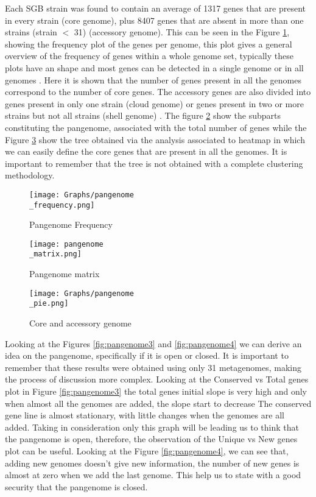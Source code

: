 \documentclass[a4paper,titlepage, oneside]{book}
\begin{document}
Each SGB strain was found to contain an average of 1317 genes that are present in every strain (core genome), plus 8407 genes that are absent in more than one strains (strain $<$ 31) (accessory genome). This can be seen in the Figure \ref{fig:pangenome2}, showing the frequency plot of the genes per genome, this plot gives a general overview of the frequency of genes within a whole genome set, typically these plots have an shape and most genes can be detected in a single genome or in all genomes \cite{Analysis-roary}. Here it is shown that the number of genes present in all the genomes correspond to the number of core genes.
The accessory genes are also divided into genes present in only one strain (cloud genome) or genes present in two or more strains but not all strains (shell genome) \cite{Medini}. The figure \ref{fig:pangenome1} show the subparts constituting the pangenome, associated with the total number of genes while the Figure \ref{fig:pangenome5} show the tree obtained via the analysis associated to heatmap in which we can easily define the core genes that are present in all the genomes. It is important to remember that the tree is not obtained with a complete clustering methodology.


\begin{figure}[ht]
\centering
\texttt{[image: Graphs/pangenome\\\_frequency.png]}
\caption{Pangenome Frequency}
\label{fig:pangenome2}
\end{figure}

\begin{figure}[ht]
\centering
\texttt{[image: pangenome\\\_matrix.png]}
\caption{Pangenome matrix}
\label{fig:pangenome1}
\end{figure}

\begin{figure}[ht]
\centering
\texttt{[image: Graphs/pangenome\\\_pie.png]}
\caption{Core and accessory genome}
\label{fig:pangenome5}
\end{figure}


Looking at the Figures \ref{fig:pangenome3} and  \ref{fig:pangenome4} we can derive an idea on the pangenome, specifically if it is open or closed. It is important to remember that these results were obtained using only 31 metagenomes, making the process of discussion more complex. Looking at the Conserved vs Total genes plot in Figure \ref{fig:pangenome3} the total genes initial slope is very high and only when almost all the genomes are added, the slope start to decrease The conserved gene line is almost stationary, with little changes when the genomes are all added. Taking in consideration only this graph will be leading us to think that the pangenome is open, therefore, the observation of the Unique vs New genes plot can be useful. Looking at the Figure \ref{fig:pangenome4}, we can see that, adding new genomes doesn't give new information, the number of new genes is almost at zero when we add the last genome. This help us to state with a good security that the pangenome is closed.
\end{document}
